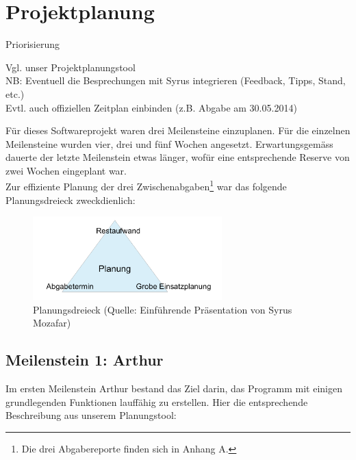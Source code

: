 \section{Projektplanung}



Priorisierung

Vgl. unser Projektplanungstool \\

NB: Eventuell die Besprechungen mit Syrus integrieren (Feedback, Tipps, Stand, etc.) \\

Evtl. auch offiziellen Zeitplan einbinden (z.B. Abgabe am 30.05.2014) \\

\vspace*{1cm}



Für dieses Softwareprojekt waren drei Meilensteine einzuplanen. Für die einzelnen Meilensteine wurden vier, drei und fünf Wochen angesetzt. Erwartungsgemäss dauerte der letzte Meilenstein etwas länger, wofür eine entsprechende Reserve von zwei Wochen eingeplant war.\\
Zur effiziente Planung der drei Zwischenabgaben\footnote{Die drei Abgabereporte finden sich in Anhang A.} war das folgende Planungsdreieck zweckdienlich:

\begin{figure}[h]
  \centering
	\includegraphics [width=0.65\textwidth]{images/Planungsdreieck_Quelle.png} 
	\caption{Planungsdreieck (Quelle: Einführende Präsentation von Syrus Mozafar)}
\end{figure}




\subsection{Meilenstein 1: Arthur}


Im ersten Meilenstein Arthur bestand das Ziel darin, das Programm mit einigen grundlegenden Funktionen lauffähig zu erstellen. Hier die entsprechende Beschreibung aus unserem Planungstool: \\

